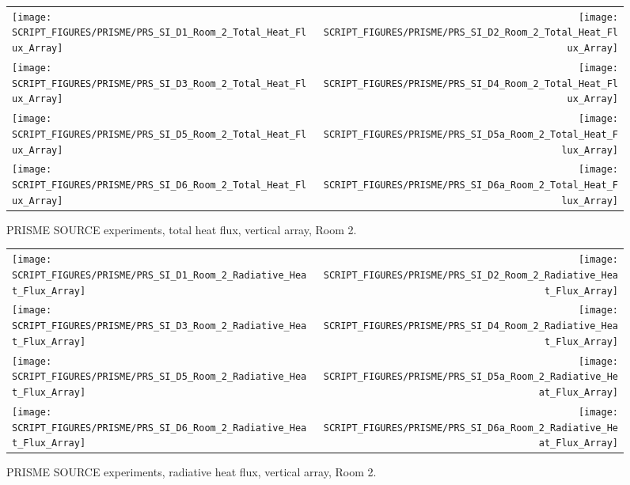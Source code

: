 \begin{figure}[p]
\begin{tabular*}{\textwidth}{l@{\extracolsep{\fill}}r}
\texttt{[image: SCRIPT\_FIGURES/PRISME/PRS\_SI\_D1\_Room\_2\_Total\_Heat\_Flux\_Array]} &
\texttt{[image: SCRIPT\_FIGURES/PRISME/PRS\_SI\_D2\_Room\_2\_Total\_Heat\_Flux\_Array]} \\
\texttt{[image: SCRIPT\_FIGURES/PRISME/PRS\_SI\_D3\_Room\_2\_Total\_Heat\_Flux\_Array]} &
\texttt{[image: SCRIPT\_FIGURES/PRISME/PRS\_SI\_D4\_Room\_2\_Total\_Heat\_Flux\_Array]} \\
\texttt{[image: SCRIPT\_FIGURES/PRISME/PRS\_SI\_D5\_Room\_2\_Total\_Heat\_Flux\_Array]} &
\texttt{[image: SCRIPT\_FIGURES/PRISME/PRS\_SI\_D5a\_Room\_2\_Total\_Heat\_Flux\_Array]} \\
\texttt{[image: SCRIPT\_FIGURES/PRISME/PRS\_SI\_D6\_Room\_2\_Total\_Heat\_Flux\_Array]} &
\texttt{[image: SCRIPT\_FIGURES/PRISME/PRS\_SI\_D6a\_Room\_2\_Total\_Heat\_Flux\_Array]}
\end{tabular*}
\caption{PRISME SOURCE experiments, total heat flux, vertical array, Room 2.}
\label{PRISME_SOURCE_Wall_Array_THF_Room_2}
\end{figure}

\begin{figure}[p]
\begin{tabular*}{\textwidth}{l@{\extracolsep{\fill}}r}
\texttt{[image: SCRIPT\_FIGURES/PRISME/PRS\_SI\_D1\_Room\_2\_Radiative\_Heat\_Flux\_Array]} &
\texttt{[image: SCRIPT\_FIGURES/PRISME/PRS\_SI\_D2\_Room\_2\_Radiative\_Heat\_Flux\_Array]} \\
\texttt{[image: SCRIPT\_FIGURES/PRISME/PRS\_SI\_D3\_Room\_2\_Radiative\_Heat\_Flux\_Array]} &
\texttt{[image: SCRIPT\_FIGURES/PRISME/PRS\_SI\_D4\_Room\_2\_Radiative\_Heat\_Flux\_Array]} \\
\texttt{[image: SCRIPT\_FIGURES/PRISME/PRS\_SI\_D5\_Room\_2\_Radiative\_Heat\_Flux\_Array]} &
\texttt{[image: SCRIPT\_FIGURES/PRISME/PRS\_SI\_D5a\_Room\_2\_Radiative\_Heat\_Flux\_Array]} \\
\texttt{[image: SCRIPT\_FIGURES/PRISME/PRS\_SI\_D6\_Room\_2\_Radiative\_Heat\_Flux\_Array]} &
\texttt{[image: SCRIPT\_FIGURES/PRISME/PRS\_SI\_D6a\_Room\_2\_Radiative\_Heat\_Flux\_Array]}
\end{tabular*}
\caption{PRISME SOURCE experiments, radiative heat flux, vertical array, Room 2.}
\label{PRISME_SOURCE_Wall_Array_RHF_Room_2}
\end{figure}

